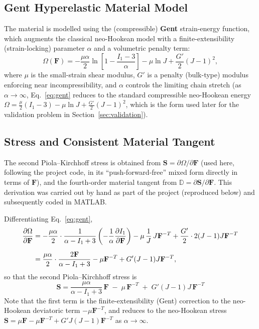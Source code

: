 \documentclass[11pt,a4paper]{article}
\newcommand{\bF}{\mathbf{F}}
\newcommand{\bS}{\mathbf{S}}
\newcommand{\bD}{\mathbb{D}}
\begin{document}
\subsection{Gent Hyperelastic Material Model}
The material is modelled using the (compressible) \textbf{Gent} strain-energy function, which augments the
classical neo-Hookean model with a finite-extensibility (strain-locking) parameter $\alpha$ and a
volumetric penalty term:
\begin{equation}
\Omega(\bF) = -\frac{\mu\alpha}{2}\ln\!\left[1-\frac{I_1-3}{\alpha}\right] - \mu\ln J
+ \frac{G'}{2}\left(J-1\right)^{2},
\label{eq:gent}
\end{equation}
where $\mu$ is the small-strain shear modulus, $G'$ is a penalty (bulk-type) modulus enforcing near
incompressibility, and $\alpha$ controls the limiting chain stretch (as $\alpha\to\infty$, Eq.~\eqref{eq:gent}
reduces to the standard compressible neo-Hookean energy $\Omega = \tfrac{\mu}{2}(I_1-3)-\mu\ln J +
\tfrac{G'}{2}(J-1)^2$, which is the form used later for the validation problem in Section~\ref{sec:validation}).

\subsection{Stress and Consistent Material Tangent}
The second Piola--Kirchhoff stress is obtained from $\bS = \partial \Omega/\partial \bF$ (used here, following
the project code, in its ``push-forward-free'' mixed form directly in terms of $\bF$), and the fourth-order
material tangent from $\bD = \partial \bS/\partial \bF$. This derivation was carried out by hand as part of
the project (reproduced below) and subsequently coded in MATLAB.

Differentiating Eq.~\eqref{eq:gent},
\begin{align}
\frac{\partial \Omega}{\partial \bF}
&= -\frac{\mu\alpha}{2}\cdot\frac{1}{\alpha - I_1+3}\left(-\frac{1}{\alpha}\frac{\partial I_1}{\partial \bF}\right)
 - \mu\,\frac{1}{J}\,J\bF^{-T} + \frac{G'}{2}\cdot 2(J-1)J\bF^{-T} \notag\\[2mm]
&= \frac{\mu\alpha}{2}\cdot\frac{2\bF}{\alpha-I_1+3} - \mu\bF^{-T} + G'(J-1)J\bF^{-T},
\end{align}
so that the second Piola--Kirchhoff stress is
\begin{equation}
\boxed{\;\bS = \frac{\mu\alpha}{\alpha-I_1+3}\,\bF \;-\; \mu\,\bF^{-T} \;+\; G'(J-1)J\,\bF^{-T}\;}
\label{eq:S}
\end{equation}
Note that the first term is the finite-extensibility (Gent) correction to the neo-Hookean deviatoric term
$-\mu \bF^{-T}$, and reduces to the neo-Hookean stress $\bS = \mu \bF - \mu \bF^{-T}+G'J(J-1)\bF^{-T}$ as
$\alpha\to\infty$.
\end{document}
